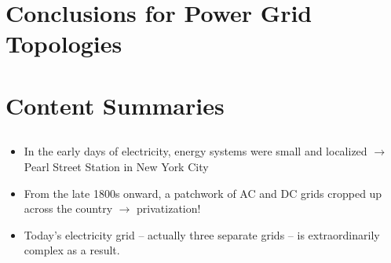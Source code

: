 \documentclass[paper=a4, fontsize=12pt]{article}
\begin{document}
\section*{Conclusions for Power Grid Topologies}

\section*{Content Summaries}

\subsection*{\citeauthor{BURN} \cite{BURN}}

\begin{itemize}
\item In the early days of electricity, energy systems were small and localized $\rightarrow$ Pearl Street Station in New York City
\item From the late 1800s onward, a patchwork of AC and DC grids cropped up across the country $\rightarrow$ privatization!
\item Today’s electricity grid – actually three separate grids – is extraordinarily complex as a result.
\end{itemize}

\subsection*{\citeauthor{50Hertz} \cite{50Hertz}}
\end{document}
